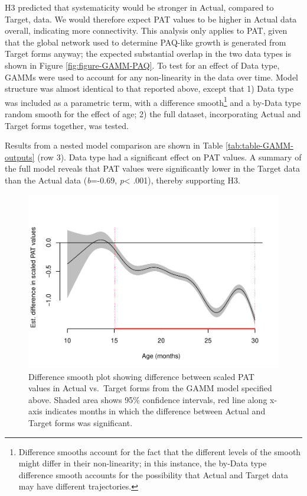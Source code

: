 \documentclass[
  man,mask,floatsintext]{apa6}
\begin{document}
H3 predicted that systematicity would be stronger in Actual, compared to Target, data. We would therefore expect PAT values to be higher in Actual data overall, indicating more connectivity. This analysis only applies to PAT, given that the global network used to determine PAQ-like growth is generated from Target forms anyway; the expected substantial overlap in the two data types is shown in Figure \ref{fig:figure-GAMM-PAQ}. To test for an effect of Data type, GAMMs were used to account for any non-linearity in the data over time. Model structure was almost identical to that reported above, except that 1) Data type was included as a parametric term, with a difference smooth\footnote{Difference smooths account for the fact that the different levels of the smooth might differ in their non-linearity; in this instance, the by-Data type difference smooth accounts for the possibility that Actual and Target data may have different trajectories.} and a by-Data type random smooth for the effect of age; 2) the full dataset, incorporating Actual and Target forms together, was tested.

Results from a nested model comparison are shown in Table \ref{tab:table-GAMM-outputs} (row 3). Data type had a significant effect on PAT values. A summary of the full model reveals that PAT values were significantly lower in the Target data than the Actual data (\emph{b}=-0.69, \emph{p}\textless{} .001), thereby supporting H3.

\begin{figure}
\centering
\includegraphics{PhonNetworksProj-anon_files/figure-latex/difference-smooth-data-type-1.pdf}
\caption{\label{fig:difference-smooth-data-type}Difference smooth plot showing difference between scaled PAT values in Actual vs.~Target forms from the GAMM model specified above. Shaded area shows 95\% confidence intervals, red line along x-axis indicates months in which
the difference between Actual and Target forms was significant.}
\end{figure}
\end{document}
